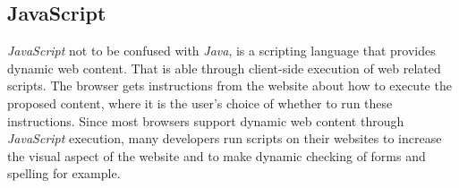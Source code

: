 \subsection{JavaScript}
\textit{JavaScript} not to be confused with \textit{Java}, is a scripting language that provides dynamic web content. That is able through client-side execution of web related scripts. The browser gets instructions from the website about how to execute the proposed content, where it is the user’s choice of whether to run these instructions.
Since most browsers support dynamic web content through \textit{JavaScript} execution, many developers run scripts on their websites to increase the visual aspect of the website and to make dynamic checking of forms and spelling for example.\cite{javascript}